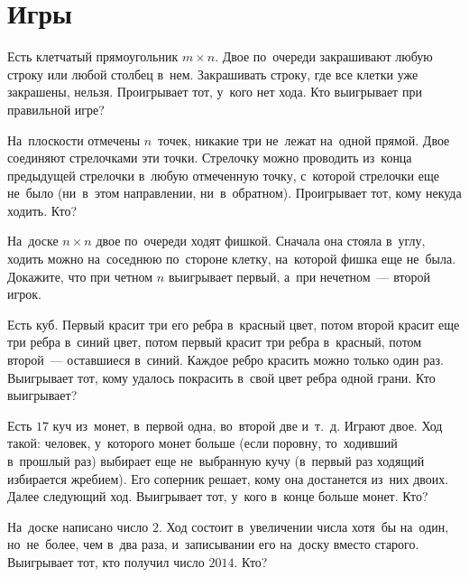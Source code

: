 
\section*{Игры}


\begin{problems}

\item
Есть клетчатый прямоугольник $m \times n$.
Двое по~очереди закрашивают любую строку или любой столбец в~нем.
Закрашивать строку, где все клетки уже закрашены, нельзя.
Проигрывает тот, у~кого нет хода.
Кто выигрывает при правильной игре?

\item
На~плоскости отмечены $n$~точек, никакие три не~лежат на~одной прямой.
Двое соединяют стрелочками эти точки.
Стрелочку можно проводить из~конца предыдущей стрелочки в~любую отмеченную
точку, с~которой стрелочки еще не~было (ни~в~этом направлении, ни~в~обратном).
Проигрывает тот, кому некуда ходить.
Кто?

\item
На~доске $n \times n$ двое по~очереди ходят фишкой.
Сначала она стояла в~углу, ходить можно на~соседнюю по~стороне клетку,
на~которой фишка еще не~была.
Докажите, что при четном $n$ выигрывает первый, а~при нечетном~--- второй
игрок.

\item
Есть куб.
Первый красит три его ребра в~красный цвет, потом второй красит еще три ребра
в~синий цвет, потом первый красит три ребра в~красный, потом второй~---
оставшиеся в~синий.
Каждое ребро красить можно только один раз.
Выигрывает тот, кому удалось покрасить в~свой цвет ребра одной грани.
Кто выигрывает?

\item
Есть $17$ куч из~монет, в~первой одна, во~второй две и~т.~д.
Играют двое.
Ход такой: человек, у~которого монет больше (если поровну, то~ходивший
в~прошлый раз) выбирает еще не~выбранную кучу (в~первый раз ходящий избирается
жребием).
Его соперник решает, кому она достанется из~них двоих.
Далее следующий ход.
Выигрывает тот, у~кого в~конце больше монет.
Кто?

\item
На~доске написано число $2$.
Ход состоит в~увеличении числа хотя~бы на~один, но~не~более, чем в~два раза,
и~записывании его на~доску вместо старого.
Выигрывает тот, кто получил число $2014$.
Кто?

\end{problems}

